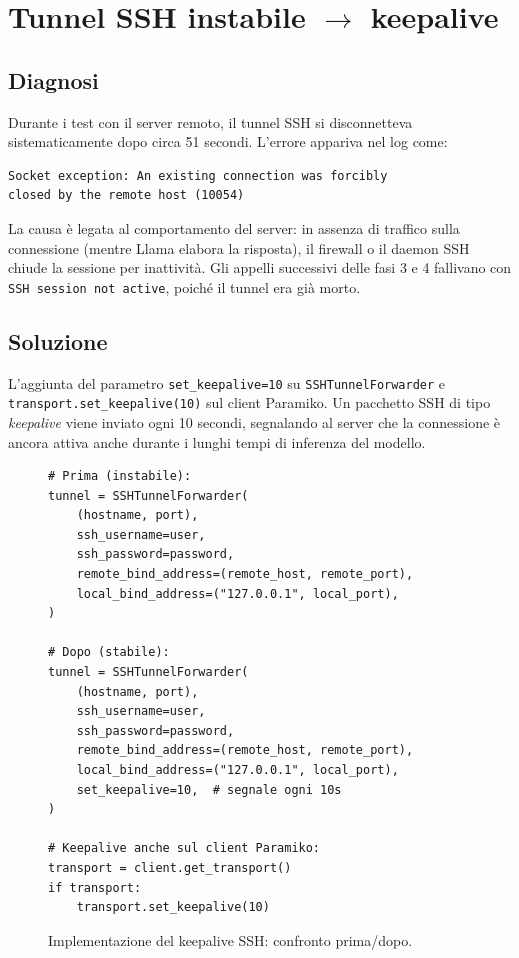 \documentclass[11pt]{report}
\begin{document}
\section{Tunnel SSH instabile $\rightarrow$ keepalive}
 
\subsection*{Diagnosi}
Durante i test con il server remoto, il tunnel SSH si disconnetteva sistematicamente dopo circa 51 secondi. L'errore appariva nel log come:
 
\begin{verbatim}
Socket exception: An existing connection was forcibly 
closed by the remote host (10054)
\end{verbatim}
 
La causa è legata al comportamento del server: in assenza di traffico sulla connessione (mentre Llama elabora la risposta), il firewall o il daemon SSH chiude la sessione per inattività. Gli appelli successivi delle fasi 3 e 4 fallivano con \texttt{SSH session not active}, poiché il tunnel era già morto.
 
\subsection*{Soluzione}
L'aggiunta del parametro \texttt{set\_keepalive=10} su \texttt{SSHTunnelForwarder} e \texttt{transport.set\_keepalive(10)} sul client Paramiko. Un pacchetto SSH di tipo \textit{keepalive} viene inviato ogni 10 secondi, segnalando al server che la connessione è ancora attiva anche durante i lunghi tempi di inferenza del modello.
 
\begin{figure}[H]
\begin{verbatim}
# Prima (instabile):
tunnel = SSHTunnelForwarder(
    (hostname, port),
    ssh_username=user,
    ssh_password=password,
    remote_bind_address=(remote_host, remote_port),
    local_bind_address=("127.0.0.1", local_port),
)
 
# Dopo (stabile):
tunnel = SSHTunnelForwarder(
    (hostname, port),
    ssh_username=user,
    ssh_password=password,
    remote_bind_address=(remote_host, remote_port),
    local_bind_address=("127.0.0.1", local_port),
    set_keepalive=10,  # segnale ogni 10s
)
 
# Keepalive anche sul client Paramiko:
transport = client.get_transport()
if transport:
    transport.set_keepalive(10)
\end{verbatim}
\caption{Implementazione del keepalive SSH: confronto prima/dopo.}
\end{figure}
 
\end{document}
